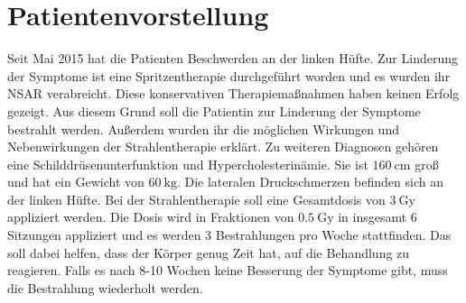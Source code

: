 \section{Patientenvorstellung}

Seit Mai 2015 hat die Patienten Beschwerden an der linken Hüfte. Zur Linderung der Symptome ist eine Spritzentherapie durchgeführt worden
und es wurden ihr NSAR verabreicht.
Diese konservativen Therapiemaßnahmen haben keinen Erfolg gezeigt. Aus diesem Grund soll die Patientin zur Linderung der Symptome bestrahlt werden.
Außerdem wurden ihr die möglichen Wirkungen und Nebenwirkungen der Strahlentherapie erklärt. Zu weiteren Diagnosen gehören eine
Schilddrüsenunterfunktion und Hypercholesterinämie. Sie ist $\SI{160}{\centi\meter}$ groß und hat ein Gewicht von $\SI{60}{\kilo\gram}$.
Die lateralen Druckschmerzen befinden sich an der linken Hüfte. Bei der Strahlentherapie soll eine Gesamtdosis von $\SI{3}{\gray}$ appliziert werden.
Die Dosis wird in Fraktionen von $\SI{0,5}{\gray}$ in insgesamt 6 Sitzungen appliziert und es werden 3 Bestrahlungen pro Woche stattfinden.
Das soll dabei helfen, dass der Körper genug Zeit hat, auf die Behandlung zu reagieren. Falls es nach 8-10 Wochen keine Besserung der Symptome gibt,
muss die Bestrahlung wiederholt werden.
